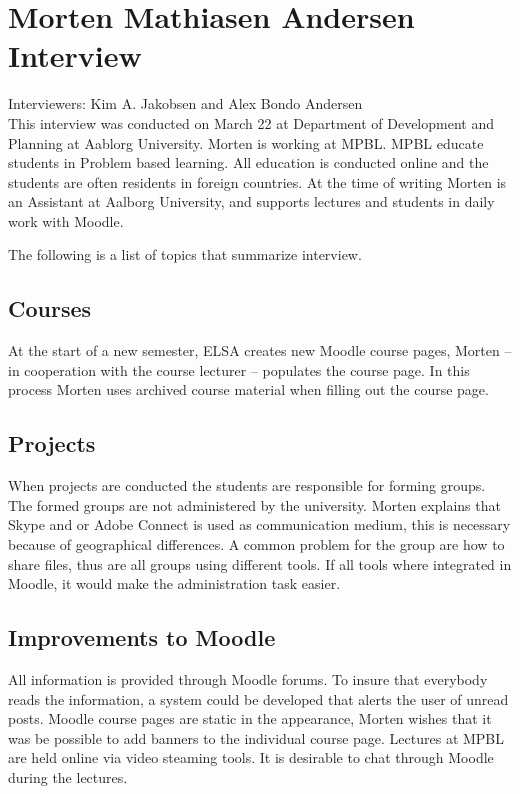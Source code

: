 \section{Morten Mathiasen Andersen Interview}
\label{sec:morten}
Interviewers: Kim A. Jakobsen and Alex Bondo Andersen\\

This interview was conducted on March 22\ths{} at Department of Development and Planning at Aablorg University.
Morten is working at MPBL. 
MPBL educate students in Problem based learning.
All education is conducted online and the students are often residents in foreign countries. 
At the time of writing Morten is an Assistant at Aalborg University, and supports lectures and students in daily work with Moodle.

The following is a list of topics that summarize interview.

\subsection*{Courses}
At the start of a new semester, ELSA creates new Moodle course pages, Morten -- in cooperation with the course lecturer -- populates the course page. 
In this process Morten uses archived course material when filling out the course page.

\subsection*{Projects}
When projects are conducted the students are responsible for forming groups. 
The formed groups are not administered by the university.
Morten explains that Skype and or Adobe Connect is used as communication medium, this is necessary because of geographical differences. 
A common problem for the group are how to share files, thus are all groups using different tools. 
If all tools where integrated in Moodle, it would make the administration task easier.

\subsection*{Improvements to Moodle}
All information is provided through Moodle forums. 
To insure that everybody reads the information, a system could be developed that alerts the user of unread posts.
Moodle course pages are static in the appearance, Morten wishes that it was be possible to add banners to the individual course page.
Lectures at MPBL are held online via video steaming tools. 
It is desirable to chat through Moodle during the lectures.   
